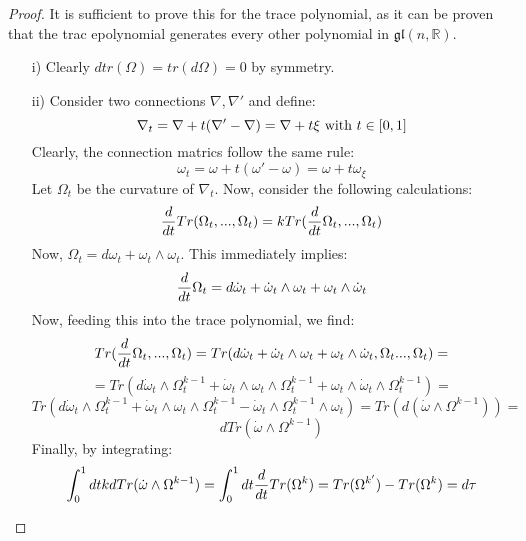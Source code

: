 \documentclass[12pt,a4paper]{report}
\theoremstyle{definition}
\theoremstyle{Theorem}
\theoremstyle{definition}
\theoremstyle{definition}
\begin{document}
	\begin{proof}
		It is sufficient to prove this for the trace polynomial, as it can be proven that the trac epolynomial generates every other polynomial in $\mathfrak{gl}(n,\mathbb{R})$.\\
		\begin{itemize}
			\item[i)] Clearly $dtr(\Omega)=tr(d\Omega)=0$ by symmetry.
			\item[ii)] Consider two connections $\nabla,\nabla'$ and define:
			$$\nabla_t=\nabla+t(\nabla'-\nabla )=\nabla+t\xi\hbox{ with } t\in[0,1]$$
			Clearly, the connection matrics follow the same rule:
			$$\omega_t=\omega+t(\omega'-\omega)=\omega+t\omega_\xi$$
			Let $\Omega_t$ be the curvature of $\nabla_t$. Now, consider the following calculations:
			$${d\over dt}Tr(\Omega_t,...,\Omega_t)=kTr({d\over dt}\Omega_t,...,\Omega_t)$$
			Now, $\Omega_t=d\omega_t+\omega_t\wedge\omega_t$. This immediately implies:
			$${d\over dt}\Omega_t=d\dot{\omega}_t+\dot{\omega}_t\wedge \omega_t+\omega_t\wedge\dot{\omega}_t$$
			Now, feeding this into the trace polynomial, we find:
			$$Tr({d\over dt}\Omega_t,...,\Omega_t)=Tr(d\dot{\omega}_t+\dot{\omega}_t\wedge \omega_t+\omega_t\wedge\dot{\omega}_t ,\Omega_t...,\Omega_t)=$$
			$$=Tr(d\dot{\omega}_t\wedge \Omega_t^{k-1}+\dot{\omega}_t\wedge \omega_t\wedge \Omega_t^{k-1}+\omega_t\wedge\dot{\omega}_t\wedge \Omega_t^{k-1})=$$
			$$Tr(d\dot{\omega}_t\wedge \Omega_t^{k-1}+\dot{\omega}_t\wedge \omega_t\wedge \Omega_t^{k-1}-\dot{\omega}_t\wedge \Omega_t^{k-1}\wedge \omega_t)=Tr(d(\dot{\omega}\wedge \Omega^{k-1}))=$$
			$$dTr(\dot{\omega}\wedge \Omega^{k-1})$$
			Finally, by integrating:
			$$\int_0^1dt kdTr(\dot{\omega}\wedge \Omega^{k-1})=\int_0^1dt {d\over dt}Tr(\Omega^k)=Tr(\Omega^{k'})-Tr(\Omega^{k})=d\tau$$
		\end{itemize}
	\end{proof}
\end{document}
